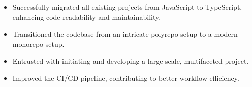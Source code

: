 \documentclass[10pt,a4paper,ragged2e,dvipsnames]{altacv}
\begin{document}

    \begin{fullwidth}
      \makecvheader
    \end{fullwidth}



    \begin{itemize}
      \item Successfully migrated all existing projects from JavaScript to TypeScript, enhancing code readability and maintainability.
      \item Transitioned the codebase from an intricate polyrepo setup to a modern monorepo setup.
      \item Entrusted with initiating and developing a large-scale, multifaceted project.
      \item Improved the CI/CD pipeline, contributing to better workflow efficiency.
    \end{itemize}

    \divider
\end{document}
